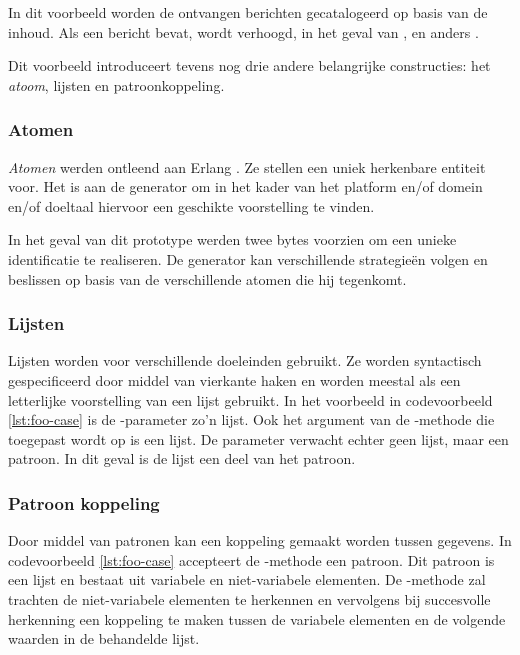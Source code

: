 In dit voorbeeld worden de ontvangen berichten gecatalogeerd op basis van de
inhoud. Als een bericht  bevat, wordt  verhoogd,
in het geval van ,  en anders .

Dit voorbeeld introduceert tevens nog drie andere belangrijke constructies: het
\emph{atoom}, lijsten en patroonkoppeling.

\vspace{-3mm}

\subsubsection{Atomen}

\emph{Atomen} werden ontleend aan Erlang \citep{armstrong1993concurrent}. Ze
stellen een uniek herkenbare entiteit voor. Het is aan de generator om in het
kader van het platform en/of domein en/of doeltaal hiervoor een geschikte
voorstelling te vinden.

In het geval van dit prototype werden twee bytes voorzien om een unieke
identificatie te realiseren. De generator kan verschillende strategie\"en
volgen en beslissen op basis van de verschillende atomen die hij tegenkomt.

\vspace{-3mm}

\subsubsection{Lijsten}

Lijsten worden voor verschillende doeleinden gebruikt. Ze worden syntactisch
gespecificeerd door middel van vierkante haken en worden meestal als een
letterlijke voorstelling van een lijst gebruikt. In het voorbeeld in
codevoorbeeld \ref{lst:foo-case} is de -parameter zo'n lijst. Ook
het argument van de -methode die toegepast wordt op 
is een lijst. De parameter verwacht echter geen lijst, maar een patroon. In dit
geval is de lijst een deel van het patroon.

\vspace{-3mm}

\subsubsection{Patroon koppeling}

Door middel van patronen kan een koppeling gemaakt worden tussen gegevens. In
codevoorbeeld \ref{lst:foo-case} accepteert de -methode een
patroon. Dit patroon is een lijst en bestaat uit variabele en niet-variabele
elementen. De -methode zal trachten de niet-variabele elementen
te herkennen en vervolgens bij succesvolle herkenning een koppeling te maken
tussen de variabele elementen en de volgende waarden in de behandelde lijst.

